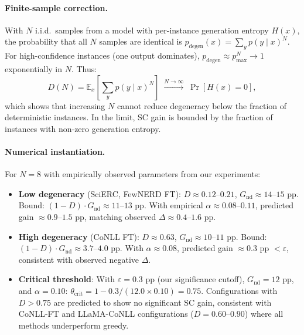 \paragraph{Finite-sample correction.}
With $N$ i.i.d.\ samples from a model with per-instance generation entropy $H(x)$, the probability that all $N$ samples are identical is $p_{\text{degen}}(x) = \sum_y p(y \mid x)^N$. For high-confidence instances (one output dominates), $p_{\text{degen}} \approx p_{\max}^N \to 1$ exponentially in $N$. Thus:
\begin{equation}
\label{eq:finite-sample}
D(N) = \mathbb{E}_x\!\left[\sum_y p(y \mid x)^N\right] \;\xrightarrow{N \to \infty}\; \Pr[H(x) = 0],
\end{equation}
which shows that increasing $N$ cannot reduce degeneracy below the fraction of deterministic instances. In the limit, SC gain is bounded by the fraction of instances with non-zero generation entropy.

\paragraph{Numerical instantiation.}
For $N = 8$ with empirically observed parameters from our experiments:
\begin{itemize}
\item \textbf{Low degeneracy} (SciERC, FewNERD FT): $D \approx 0.12$--$0.21$, $G_{\text{nd}} \approx 14$--$15$ pp. Bound: $(1-D) \cdot G_{\text{nd}} \approx 11$--$13$ pp. With empirical $\alpha \approx 0.08$--$0.11$, predicted gain $\approx 0.9$--$1.5$ pp, matching observed $\Delta \approx 0.4$--$1.6$ pp.

\item \textbf{High degeneracy} (CoNLL FT): $D \approx 0.63$, $G_{\text{nd}} \approx 10$--$11$ pp. Bound: $(1-D) \cdot G_{\text{nd}} \approx 3.7$--$4.0$ pp. With $\alpha \approx 0.08$, predicted gain $\approx 0.3$ pp $< \varepsilon$, consistent with observed negative $\Delta$.

\item \textbf{Critical threshold}: With $\varepsilon = 0.3$ pp (our significance cutoff), $G_{\text{nd}} = 12$ pp, and $\alpha = 0.10$:
$\theta_{\text{crit}} = 1 - 0.3 / (12.0 \times 0.10) = 0.75$. Configurations with $D > 0.75$ are predicted to show no significant SC gain, consistent with CoNLL-FT and LLaMA-CoNLL configurations ($D = 0.60$--$0.90$) where all methods underperform greedy.
\end{itemize}
